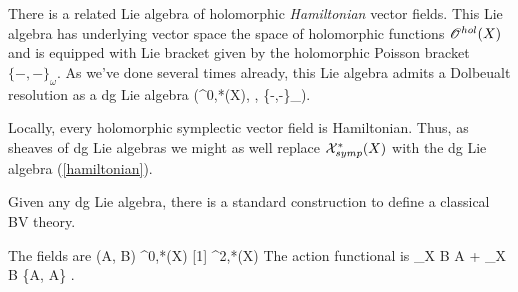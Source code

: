 \documentclass[10pt]{amsart}
\begin{document}
There is a related Lie algebra of holomorphic {\em Hamiltonian} vector fields. 
This Lie algebra has underlying vector space the space of holomorphic functions $\mathscr O^{hol}(X)$ and is equipped with Lie bracket given by the holomorphic Poisson bracket $\{-,-\}_\omega$. 
As we've done several times already, this Lie algebra admits a Dolbeualt resolution as a dg Lie algebra 
\be\label{hamiltonian}
\left(\Omega^{0,*}(X), \dbar, \{-,-\}_\omega \right).
\ee

Locally, every holomorphic symplectic vector field is Hamiltonian. 
Thus, as sheaves of dg Lie algebras we might as well replace $\mathcal X_{symp}^{*}(X)$ with the dg Lie algebra (\ref{hamiltonian}). 

Given any dg Lie algebra, there is a standard construction to define a classical BV theory.

The fields are
\ben
(A, B) \in \Omega^{0,*}(X) [1] \oplus \Omega^{2,*}(X) 
\een
The action functional is
\ben
\int_X B \dbar A +  \int_X B \{A, A\} .
\end{document}

